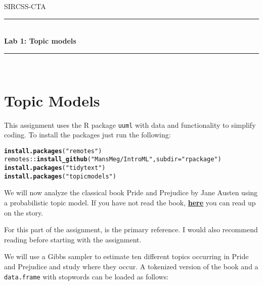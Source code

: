 \documentclass[11pt,a4paper,english]{article}\usepackage[]{graphicx}\usepackage[]{xcolor}
\makeatletter
\newcommand{\hlstr}[1]{\textcolor[rgb]{0.192,0.494,0.8}{#1}}%
\newcommand{\hlopt}[1]{\textcolor[rgb]{0,0,0}{#1}}%
\newcommand{\hlstd}[1]{\textcolor[rgb]{0.345,0.345,0.345}{#1}}%
\newcommand{\hlkwc}[1]{\textcolor[rgb]{0.333,0.667,0.333}{#1}}%
\newcommand{\hlkwd}[1]{\textcolor[rgb]{0.737,0.353,0.396}{\textbf{#1}}}%
\newenvironment{kframe}{%
 \def\at@end@of@kframe{}%
 \ifinner\ifhmode%
  \def\at@end@of@kframe{\end{minipage}}%
  \begin{minipage}{\columnwidth}%
 \fi\fi%
 \def\FrameCommand##1{\hskip\@totalleftmargin \hskip-\fboxsep
 \colorbox{shadecolor}{##1}\hskip-\fboxsep
     \hskip-\linewidth \hskip-\@totalleftmargin \hskip\columnwidth}%
 \MakeFramed {\advance\hsize-\width
   \@totalleftmargin\z@ \linewidth\hsize
   \@setminipage}}%
 {\par\unskip\endMakeFramed%
 \at@end@of@kframe}
\newenvironment{knitrout}{}{} %
\newcommand{\HRule}{\rule{\linewidth}{0.5mm}}
\makeatother
\begin{document}

\begin{titlepage}

\center
\textsc{\LARGE SIRCSS-CTA}\\[1.5cm] %

\HRule \\[0.4cm]
{ \huge \bfseries Lab 1: Topic models}\\[0.4cm] %
\HRule \\[1.5cm]

\vfill

\end{titlepage}





\section{Topic Models}

This assignment uses the R package \texttt{uuml} with data and functionality to simplify coding. To install the packages just run the following:
\begin{knitrout}\small
{}\color{fgcolor}\begin{kframe}
\begin{alltt}
\hlkwd{install.packages}\hlstd{(}\hlstr{"remotes"}\hlstd{)}
\hlstd{remotes}\hlopt{::}\hlkwd{install_github}\hlstd{(}\hlstr{"MansMeg/IntroML"}\hlstd{,} \hlkwc{subdir} \hlstd{=} \hlstr{"rpackage"}\hlstd{)}
\hlkwd{install.packages}\hlstd{(}\hlstr{"tidytext"}\hlstd{)}
\hlkwd{install.packages}\hlstd{(}\hlstr{"topicmodels"}\hlstd{)}
\end{alltt}
\end{kframe}
\end{knitrout}

We will now analyze the classical book Pride and Prejudice by Jane Austen using a probabilistic topic model. If you have not read the book, \href{https://en.wikipedia.org/wiki/Pride_and_Prejudice}{\textbf{here}} you can read up on the story.

For this part of the assignment, \citet{griffiths2004finding} is the primary reference. I would also recommend reading \citet{blei2012probabilistic} before starting with the assignment.

We will use a Gibbs sampler to estimate ten different topics occurring in Pride and Prejudice and study where they occur. A tokenized version of the book and a \texttt{data.frame} with stopwords can be loaded as follows:
\end{document}
